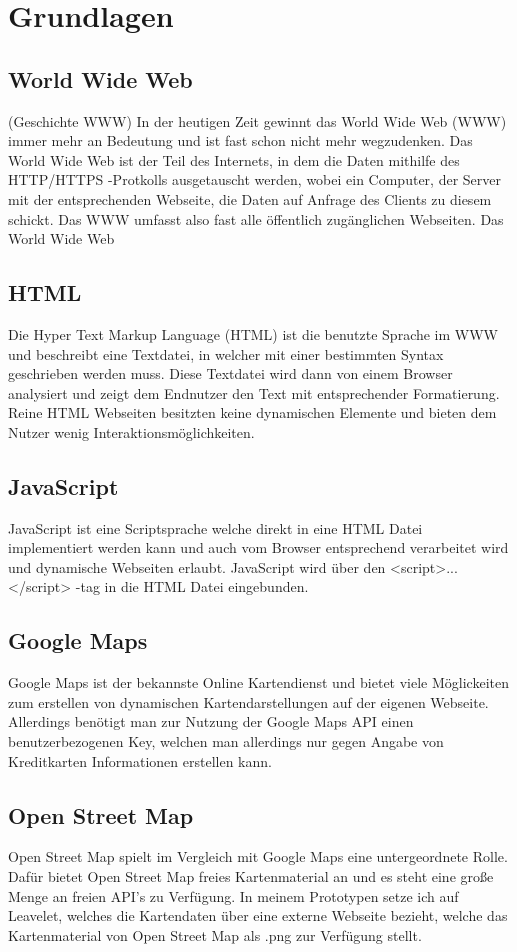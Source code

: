 \documentclass[a4paper, twoside, 12pt]{scrreprt}
\begin{document}
\section{Grundlagen}
\subsection{World Wide Web}
(Geschichte WWW)
In der heutigen Zeit gewinnt das World Wide Web (WWW) immer mehr an Bedeutung und ist fast schon nicht mehr wegzudenken.
Das World Wide Web ist der Teil des Internets, in dem die Daten mithilfe des HTTP/HTTPS -Protkolls ausgetauscht werden, wobei ein Computer, der Server mit der entsprechenden Webseite, die Daten auf Anfrage des Clients zu diesem schickt.
Das WWW umfasst also fast alle öffentlich zugänglichen Webseiten.
Das World Wide Web~\citep{www}
\subsection{HTML}
Die Hyper Text Markup Language (HTML) ist die benutzte Sprache im WWW und beschreibt eine Textdatei, in welcher mit einer bestimmten Syntax geschrieben werden muss.
Diese Textdatei wird dann von einem Browser analysiert und zeigt dem Endnutzer den Text mit entsprechender Formatierung.
Reine HTML Webseiten besitzten keine dynamischen Elemente und bieten dem Nutzer wenig Interaktionsmöglichkeiten.
\subsection{JavaScript}
JavaScript ist eine Scriptsprache welche direkt in eine HTML Datei implementiert werden kann und auch vom Browser entsprechend verarbeitet wird und dynamische Webseiten erlaubt.
JavaScript wird über den <script>...</script> -tag in die HTML Datei eingebunden.
\subsection{Google Maps}
Google Maps ist der bekannste Online Kartendienst und bietet viele Möglickeiten zum erstellen von dynamischen Kartendarstellungen auf der eigenen Webseite.
Allerdings benötigt man zur Nutzung der Google Maps API einen benutzerbezogenen Key, welchen man allerdings nur gegen Angabe von Kreditkarten Informationen erstellen kann.
\subsection{Open Street Map}
Open Street Map spielt im Vergleich mit Google Maps eine untergeordnete Rolle.
Dafür bietet Open Street Map freies Kartenmaterial an und es steht eine große Menge an freien API's zu Verfügung.
In meinem Prototypen setze ich auf Leavelet, welches die Kartendaten über eine externe Webseite bezieht, welche das Kartenmaterial von Open Street Map als .png zur Verfügung stellt.
\end{document}
